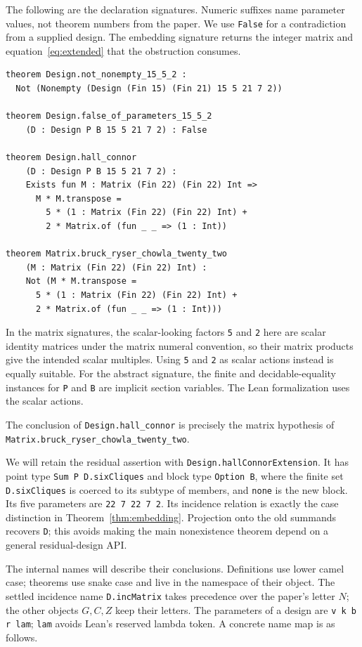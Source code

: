\documentclass[11pt]{article}
\theoremstyle{definition}
\newcommand{\code}[1]{{\small\nolinkurl{#1}}}
\begin{document}
The following are the declaration signatures. Numeric suffixes name parameter values, not
theorem numbers from the paper. We use \code{False} for a contradiction
from a supplied design. The embedding signature returns the integer
matrix and equation~\eqref{eq:extended} that the obstruction consumes.
\begin{lstlisting}
theorem Design.not_nonempty_15_5_2 :
  Not (Nonempty (Design (Fin 15) (Fin 21) 15 5 21 7 2))

theorem Design.false_of_parameters_15_5_2
    (D : Design P B 15 5 21 7 2) : False

theorem Design.hall_connor
    (D : Design P B 15 5 21 7 2) :
    Exists fun M : Matrix (Fin 22) (Fin 22) Int =>
      M * M.transpose =
        5 * (1 : Matrix (Fin 22) (Fin 22) Int) +
        2 * Matrix.of (fun _ _ => (1 : Int))

theorem Matrix.bruck_ryser_chowla_twenty_two
    (M : Matrix (Fin 22) (Fin 22) Int) :
    Not (M * M.transpose =
      5 * (1 : Matrix (Fin 22) (Fin 22) Int) +
      2 * Matrix.of (fun _ _ => (1 : Int)))
\end{lstlisting}
In the matrix signatures, the scalar-looking factors
\code{5} and \code{2} here are scalar identity matrices under the
matrix numeral convention, so their matrix products give the intended
scalar multiples. Using \code{5} and \code{2} as scalar actions instead
is equally suitable. For the abstract signature, the finite and
decidable-equality instances for \code{P} and \code{B} are implicit
section variables. The Lean formalization uses the scalar actions.

The conclusion of \code{Design.hall_connor} is precisely the matrix
hypothesis of \code{Matrix.bruck_ryser_chowla_twenty_two}.

We will retain the residual assertion with
\code{Design.hallConnorExtension}. It has point type
\code{Sum P D.sixCliques} and block type \code{Option B}, where
the finite set \code{D.sixCliques} is coerced to its subtype of
members, and \code{none} is the new block. Its five parameters are
\code{22 7 22 7 2}. Its incidence relation is exactly the case
distinction in Theorem~\ref{thm:embedding}. Projection onto the
old summands recovers \code{D}; this avoids making the main
nonexistence theorem depend on a general residual-design API.

The internal names will describe their conclusions. Definitions use
lower camel case; theorems use snake case and live in the namespace of
their object. The settled incidence name \code{D.incMatrix} takes
precedence over the paper's letter $N$; the other objects $G,C,Z$
keep their letters. The parameters of a design are
\code{v k b r lam}; \code{lam} avoids Lean's reserved lambda token.
A concrete name map is as follows.
\end{document}
